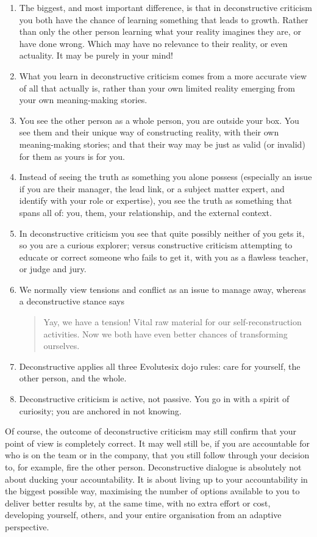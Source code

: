 \begin{enumerate}
\item The biggest, and most important difference, is that in deconstructive criticism you both have the chance of learning something that leads to growth. Rather than only the other person learning what your reality imagines they are, or have done wrong. Which may have no relevance to their reality, or even actuality. It may be purely in your mind!
\item What you learn in deconstructive criticism comes from a more accurate view of all that actually is, rather than your own limited reality emerging from your own meaning\hyp{}making stories.
\item You see the other person as a whole person, you are outside your box\cite{arbinger-leadership}. You see them and their unique way of constructing reality, with their own meaning\hyp{}making stories; and that their way may be just as valid (or invalid) for them as yours is for you.
\item Instead of seeing the truth as something you alone possess (especially an issue if you are their manager, the lead link, or a subject matter expert, and identify with your role or expertise), you see the truth as something that spans all of: you, them, your relationship, and the external context.
\item In deconstructive criticism you see that quite possibly neither of you gets it, so you are a curious explorer; versus constructive criticism attempting to educate or correct someone who fails to get it, with you as a flawless teacher, or judge and jury.
\item We normally view tensions and conflict as an issue to manage away, whereas a deconstructive stance says \begin{quote}Yay, we have a tension! Vital raw material for our self-reconstruction activities. Now we both have even better chances of transforming ourselves.\end{quote}
\item Deconstructive applies all three Evolutesix dojo rules: care for yourself, the other person, and the whole. 
\item Deconstructive criticism is active, not passive. You go in with a spirit of curiosity; you are anchored in not knowing.
\end{enumerate}


Of course, the outcome of deconstructive criticism may still confirm that your point of view is completely correct. It may well still be, if you are accountable for who is on the team or in the company, that you still follow through your decision to, for example, fire the other person. Deconstructive dialogue is absolutely not about ducking your accountability. It is about living up to your accountability in the biggest possible way, maximising the number of options available to you to deliver better results by, at the same time, with no extra effort or cost, developing yourself, others, and your entire organisation from an adaptive perspective.


